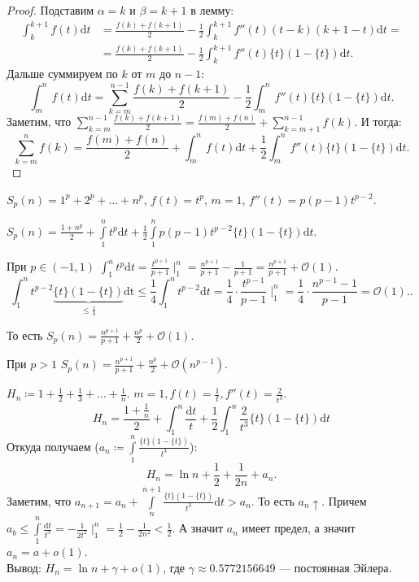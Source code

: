 \begin{proof}
    Подставим $\alpha = k$ и  $\beta = k + 1$ в лемму:
    \begin{align*}
        \int_{k}^{k+1} f(t) \mathrm{d}t &= \frac{f(k) + f(k + 1)}{2} - \frac{1}{2} \int_k^{k+1} f''(t)(t-k)(k+1-t) \mathrm{d}t = \\ &= \frac{f(k) + f(k + 1)}{2} - \frac{1}{2} \int_{k}^{k+1} f''(t) \{t\}(1-\{t\}) \mathrm{d}t
        .\end{align*} Дальше суммируем по $k$ от  $m$ до  $n-1$:  \[
    \int_m^n f(t) \mathrm{d}t = \sum_{k=m}^{n-1} \frac{f(k) + f(k + 1)}{2} - \frac{1}{2} \int_m^n f''(t)\{t\}(1-\{t\}) \mathrm{d}t
.\] Заметим, что $\sum\limits_{k=m}^{n-1} \frac{f(k) + f(k + 1)}{2} = \frac{f(m) + f(n)}{2} + \sum_{k=m+1}^{n-1} f(k)$. И тогда: 
\[
    \sum_{k=m}^n f(k) = \frac{f(m) + f(n)}{2} + \int_m^n f(t)\mathrm{d}t + \frac{1}{2} \int_m^n f''(t)\{t\}(1-\{t\})\mathrm{d}t
.\] 
\end{proof}
\begin{example}
    $S_p(n) = 1^p + 2^p + \ldots + n^p$, $f(t) = t^p$,  $m = 1$,  $f''(t) = p(p-1)t^{p-2}$.

    $S_p(n) = \frac{1+n^p}{2} + \int\limits_1^n t^p \mathrm{d}t + \frac{1}{2} \int\limits_1^n p(p-1)t^{p-2} \{t\}(1-\{t\}) \mathrm{d}t$.

    При $p \in (-1, 1)$  $\int_1^n t^p \mathrm{d}t = \frac{t^{p+1}}{p+1} \mid_1^n = \frac{n^{p+1}}{p+1} - \frac{1}{p+1} = \frac{n^{p+1}}{p+1} + \mathcal{O}(1)$.\[
        \int_1^n t^{p-2} \underbrace{\{t\}(1-\{t\})}_{\le \frac{1}{4}} \mathrm{dt} \le \frac{1}{4} \int_1^n t^{p-2} \mathrm{d}t = \frac{1}{4} \cdot \frac{t^{p-1}}{p-1} \mid_1^n = \frac{1}{4} \cdot \frac{n^{p-1} - 1}{p - 1} = \mathcal{O}(1).
    .\] 

    То есть $S_p(n) = \frac{n^{p+1}}{p+1} + \frac{n^p}{2} + \mathcal{O}(1)$.

    При $p > 1$  $S_p(n) = \frac{n^{p+1}}{p+1} + \frac{n^p}{2} + \mathcal{O}(n^{p-1})$.
\end{example}
\begin{example}
    $H_n \coloneqq 1 + \frac{1}{2} + \frac{1}{3} + \ldots + \frac{1}{n}$. $m = 1, f(t) = \frac{1}{t}, f''(t) = \frac{2}{t^3}$.
    \[
    H_n = \frac{1 + \frac{1}{n}}{2} + \int_1^n \frac{\mathrm{d}t}{t} + \frac{1}{2} \int_1^n \frac{2}{t^3}\{t\}(1-\{t\})\mathrm{d}t
    \] Откуда получаем ($a_n \coloneqq \int\limits_1^n \frac{\{t\}(1-\{t\})}{t^3} $): \[
H_n = \ln n + \frac{1}{2} + \frac{1}{2n} + a_n
.\] Заметим, что $a_{n+1} = a_n + \int\limits_n^{n+1}\frac{\{t\}(1-\{t\})}{t^3} \mathrm{d}t > a_n$. То есть $a_n\uparrow$. Причем $a_b \le \int\limits_1^n \frac{\mathrm{d}t}{t^3} = -\frac{1}{2t^2} \mid_1^n = \frac{1}{2} - \frac{1}{2n^2} < \frac{1}{2}$. А значит $a_n$ имеет предел, а значит  $a_n = a + o(1)$.
\\
Вывод:  $H_n = \ln n + \gamma + o(1)$, где  $\gamma \approx 0.5772156649$ --- постоянная Эйлера.
\end{example}
